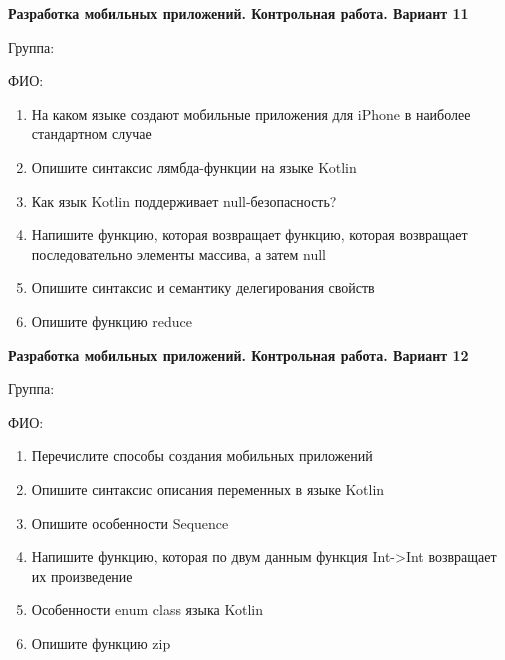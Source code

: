 \documentclass[12pt]{article}
\begin{document}
\newpage\begin{minipage}{\textwidth}
\textbf{Разработка мобильных приложений. Контрольная работа. Вариант 11}

Группа: \underline{\hspace{3cm}}

ФИО: \underline{\hspace{10cm}}

\begin{enumerate}
\item На каком языке создают мобильные приложения для iPhone в наиболее стандартном случае
\item Опишите синтаксис лямбда-функции на языке Kotlin
\item Как язык Kotlin поддерживает null-безопасность?
\item Напишите функцию, которая возвращает функцию, которая возвращает последовательно элементы массива, а затем null
\item Опишите синтаксис и семантику делегирования свойств
\item Опишите функцию reduce

\end{enumerate}
\end{minipage}

\newpage\begin{minipage}{\textwidth}
\textbf{Разработка мобильных приложений. Контрольная работа. Вариант 12}

Группа: \underline{\hspace{3cm}}

ФИО: \underline{\hspace{10cm}}

\begin{enumerate}
\item Перечислите способы создания мобильных приложений
\item Опишите синтаксис описания переменных в языке Kotlin
\item Опишите особенности Sequence
\item Напишите функцию, которая по двум данным функция Int->Int возвращает их произведение
\item Особенности enum class языка Kotlin
\item Опишите функцию zip

\end{enumerate}
\end{minipage}
\end{document}
